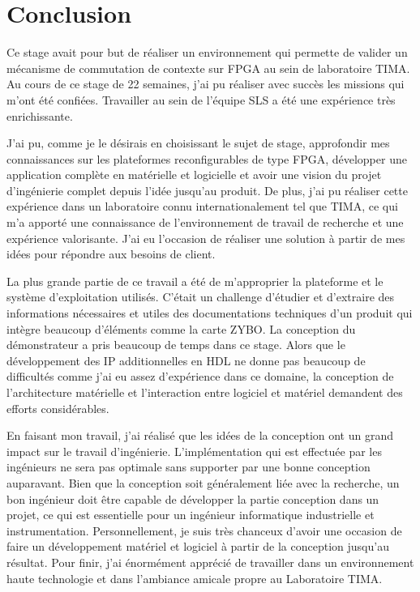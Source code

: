 \chapter{Conclusion}

Ce stage avait pour but de réaliser un environnement qui permette de valider un mécanisme de
commutation de contexte sur FPGA au sein de laboratoire TIMA.
Au cours de ce stage de 22 semaines, j’ai pu réaliser avec succès les missions qui m’ont été confiées.
Travailler au sein de l’équipe SLS a été une expérience très enrichissante. 

J’ai pu, comme je le désirais en choisissant le sujet de stage, approfondir mes connaissances 
sur les plateformes reconfigurables de type FPGA, développer une application complète en matérielle et logicielle
et avoir une vision du projet d'ingénierie complet depuis l'idée jusqu'au produit.
De plus, j'ai pu réaliser cette expérience dans un laboratoire connu internationalement tel que TIMA, ce qui
m'a apporté une connaissance de l'environnement de travail de recherche et une expérience valorisante.
J'ai eu l'occasion de réaliser une solution à partir de mes idées pour répondre aux besoins de client.

La plus grande partie de ce travail a été de m'approprier la plateforme et le système d'exploitation utilisés.
C'était un challenge d'étudier et d'extraire des informations nécessaires et utiles des documentations techniques
d'un produit qui intègre beaucoup d'éléments comme la carte ZYBO.
La conception du démonstrateur a pris beaucoup de temps dans ce stage. Alors que le développement
des IP additionnelles en HDL ne donne pas beaucoup de difficultés comme j'ai eu assez d'expérience dans ce domaine, la conception
de l'architecture matérielle et l'interaction entre logiciel et matériel demandent des efforts considérables.

En faisant mon travail, j'ai réalisé que les idées de la conception ont un grand impact sur le travail
d'ingénierie. L'implémentation qui est effectuée par les ingénieurs ne sera pas optimale
sans supporter par une bonne conception auparavant.
Bien que la conception soit généralement liée avec la recherche,
un bon ingénieur doit être capable de développer la partie conception dans un projet,
ce qui est essentielle pour un ingénieur informatique industrielle et instrumentation.
Personnellement, je suis très chanceux d'avoir une occasion de faire un développement matériel et logiciel
à partir de la conception jusqu'au résultat.
Pour finir, j’ai énormément apprécié de travailler dans un environnement haute technologie et dans l’ambiance amicale propre au Laboratoire TIMA.